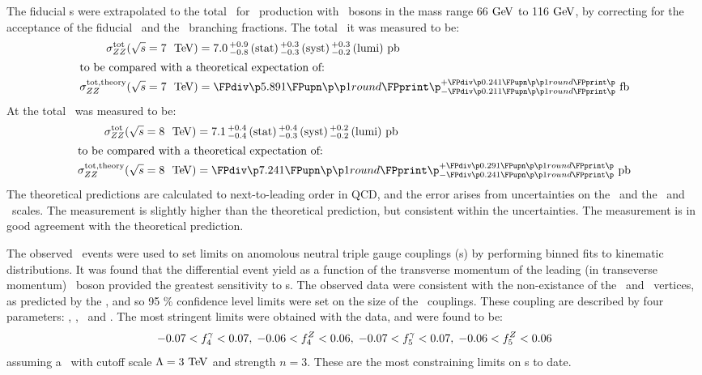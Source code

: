 The fiducial \cx s were extrapolated to the total \cx\ for \ZZ\
production with \Z\ bosons in the mass range 66$\GeV$ to 116$\GeV$, by
correcting for the acceptance of the fiducial \phasespace\ and the \Zll\
branching fractions. The total \cx\ it  was measured to be:
\begin{align}
\sigmaTotZZ(\sqrtseq{7}) &= \ZZSevenTeVTotalCrossSection \\
\intertext{to be compared with a theoretical expectation of:}
\sigmaTotTheoryZZ(\sqrtseq{7}) &= \ZZSevenTeVTheoryTotalCrossSection
\end{align}
At \sqrtseq{8} the total \cx\ was measured to be:
\begin{align}
\sigmaTotZZ(\sqrtseq{8}) &= \ZZEightTeVTotalCrossSection \\
\intertext{to be compared with a theoretical expectation of:}
\sigmaTotTheoryZZ(\sqrtseq{8}) &= \ZZEightTeVTheoryTotalCrossSection
\end{align}
The theoretical predictions are calculated to next-to-leading order in QCD, and
the error arises from uncertainties on the \partDF\ and the \fact\ and \renorm\
scales. The  measurement is slightly higher than the theoretical prediction,
but consistent within the uncertainties. The \sqrtseq{8} measurement is in good
agreement with the theoretical prediction. 

The observed \ZZllll\ events were used to set limits on anomolous neutral triple
gauge couplings (\TGC s) by performing binned fits to kinematic distributions.
It was found that the differential event yield as a function of the transverse
momentum of the leading (in transeverse momentum) \Z\ boson provided the
greatest sensitivity to \TGC s. The observed data were consistent with the non-existance of the
\ZZZ\ and \ZZg\ vertices, as predicted by the \sm, and so 95 \% confidence level
limits were set on the size of the \TGC\ couplings. These coupling are
described by four parameters: \ffourg, \ffourZ, \ffiveg\ and \ffiveZ. The
most stringent limits were obtained with the \sqrtseq{8} data, and were found to
be:
\begin{align}
-0.07 < f_{4}^{\gamma} < 0.07, \; -0.06 < f_{4}^{Z} < 0.06, \; -0.07 < f_{5}^{\gamma} < 0.07, \;
-0.06 < f_{5}^{Z} < 0.06
\end{align}
assuming a \formfactor\ with cutoff scale $\Lambda=3 \tev$ and strength $n=3$.
These are the most constraining limits on \TGC s to date.
